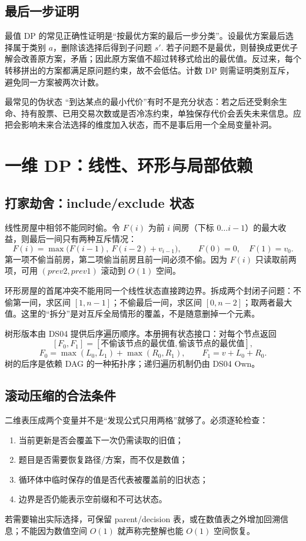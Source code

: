 \documentclass[UTF8,fontset=none,11pt,a4paper]{ctexart}
\begin{document}
\subsection{最后一步证明}

最值 DP 的常见正确性证明是“按最优方案的最后一步分类”。设最优方案最后选择属于类别 $a$，删除该选择后得到子问题 $s'$. 若子问题不是最优，则替换成更优子解会改善原方案，矛盾；因此原方案值不超过转移式给出的最优值。反过来，每个转移拼出的方案都满足原问题约束，故不会低估。计数 DP 则需证明类别互斥，避免同一方案被两次计数。

\begin{warnbox}{最常见的伪状态}
“到达某点的最小代价”有时不是充分状态：若之后还受剩余生命、持有股票、已用交易次数或是否冷冻约束，单独保存代价会丢失未来信息。应把会影响未来合法选择的维度加入状态，而不是事后用一个全局变量补洞。
\end{warnbox}

\section{一维 DP：线性、环形与局部依赖}

\subsection{打家劫舍：include/exclude 状态}

线性房屋中相邻不能同时偷。令 $F(i)$ 为前 $i$ 间房（下标 $0\ldots i-1$）的最大收益，则最后一间只有两种互斥情况：
\[
F(i)=\max\bigl(F(i-1),\ F(i-2)+v_{i-1}\bigr),
\qquad F(0)=0,\quad F(1)=v_0.
\]
第一项不偷当前房，第二项偷当前房且前一间必须不偷。因为 $F(i)$ 只读取前两项，可用 $(prev2,prev1)$ 滚动到 $O(1)$ 空间。

环形房屋的首尾冲突不能用同一个线性状态直接跨边界。拆成两个封闭子问题：不偷第一间，求区间 $[1,n-1]$；不偷最后一间，求区间 $[0,n-2]$；取两者最大值。这里的“拆分”是对互斥全局情形的覆盖，不是随意删掉一个元素。

树形版本由 DS04 提供后序遍历顺序。本册拥有状态接口：对每个节点返回
\[
[F_0,F_1]=[\text{不偷该节点的最优值},\text{偷该节点的最优值}],
\]
\[
F_0=\max(L_0,L_1)+\max(R_0,R_1),\qquad
F_1=v+L_0+R_0.
\]
树的后序是依赖 DAG 的一种拓扑序；递归遍历机制仍由 DS04 Own。

\subsection{滚动压缩的合法条件}

二维表压成两个变量并不是“发现公式只用两格”就够了。必须逐轮检查：
\begin{enumerate}
\item 当前更新是否会覆盖下一次仍需读取的旧值；
\item 题目是否需要恢复路径/方案，而不仅是数值；
\item 循环体中临时保存的值是否代表被覆盖前的旧状态；
\item 边界是否仍能表示空前缀和不可达状态。
\end{enumerate}
若需要输出实际选择，可保留 parent/decision 表，或在数值表之外增加回溯信息；不能因为数值空间 $O(1)$ 就声称完整解也能 $O(1)$ 空间恢复。
\end{document}
